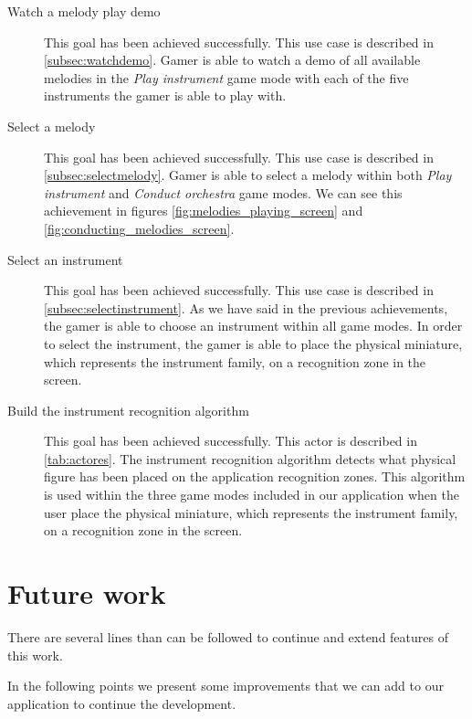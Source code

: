 \begin{description}
\item[Watch a melody play demo]
This goal has been achieved successfully. This use case is described in \ref{subsec:watchdemo}. Gamer is able to watch a demo of all available melodies in the \textit{Play instrument} game mode with each of the five instruments the gamer is able to play with.

\item[Select a melody]
This goal has been achieved successfully. This use case is described in \ref{subsec:selectmelody}. Gamer is able to select a melody within both \textit{Play instrument} and \textit{Conduct orchestra} game modes.  We can see this achievement in figures \ref{fig:melodies_playing_screen} and \ref{fig:conducting_melodies_screen}.

\item[Select an instrument]
This goal has been achieved successfully. This use case is described in \ref{subsec:selectinstrument}. As we have said in the previous achievements, the gamer is able to choose an instrument within all game modes. In order to select the instrument, the gamer is able to place the physical miniature, which represents the instrument family, on a recognition zone in the screen.

\item[Build the instrument recognition algorithm]
This goal has been achieved successfully. This actor is described in \ref{tab:actores}. The instrument recognition algorithm detects what physical figure has been placed on the application recognition zones. This algorithm is used within the three game modes included in our application when the user place the physical miniature, which represents the instrument family, on a recognition zone in the screen.

\end{description}

\section{Future work}

There are several lines than can be followed to continue and extend features of this work.

In the following points we present some improvements that we can add to our application to continue the development.

